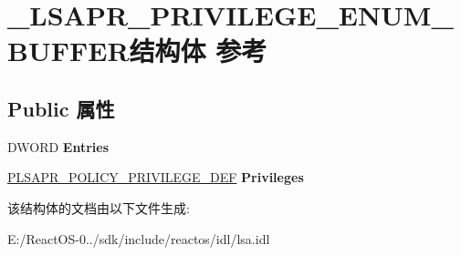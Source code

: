 \hypertarget{struct___l_s_a_p_r___p_r_i_v_i_l_e_g_e___e_n_u_m___b_u_f_f_e_r}{}\section{\+\_\+\+L\+S\+A\+P\+R\+\_\+\+P\+R\+I\+V\+I\+L\+E\+G\+E\+\_\+\+E\+N\+U\+M\+\_\+\+B\+U\+F\+F\+E\+R结构体 参考}
\label{struct___l_s_a_p_r___p_r_i_v_i_l_e_g_e___e_n_u_m___b_u_f_f_e_r}
\subsection*{Public 属性}
\begin{DoxyCompactItemize}
\item 
\mbox{\label{struct___l_s_a_p_r___p_r_i_v_i_l_e_g_e___e_n_u_m___b_u_f_f_e_r_affadd1576dd8ee4e0706421c89484fbf}} 
D\+W\+O\+RD {\bfseries Entries}
\item 
\mbox{\label{struct___l_s_a_p_r___p_r_i_v_i_l_e_g_e___e_n_u_m___b_u_f_f_e_r_a139c6630d6961ddfbcb6516a0eaffa34}} 
\hyperlink{struct___l_s_a_p_r___p_o_l_i_c_y___p_r_i_v_i_l_e_g_e___d_e_f}{P\+L\+S\+A\+P\+R\+\_\+\+P\+O\+L\+I\+C\+Y\+\_\+\+P\+R\+I\+V\+I\+L\+E\+G\+E\+\_\+\+D\+EF} {\bfseries Privileges}
\end{DoxyCompactItemize}


该结构体的文档由以下文件生成\+:\begin{DoxyCompactItemize}
\item 
E\+:/\+React\+O\+S-\/0../sdk/include/reactos/idl/lsa.\+idl\end{DoxyCompactItemize}
